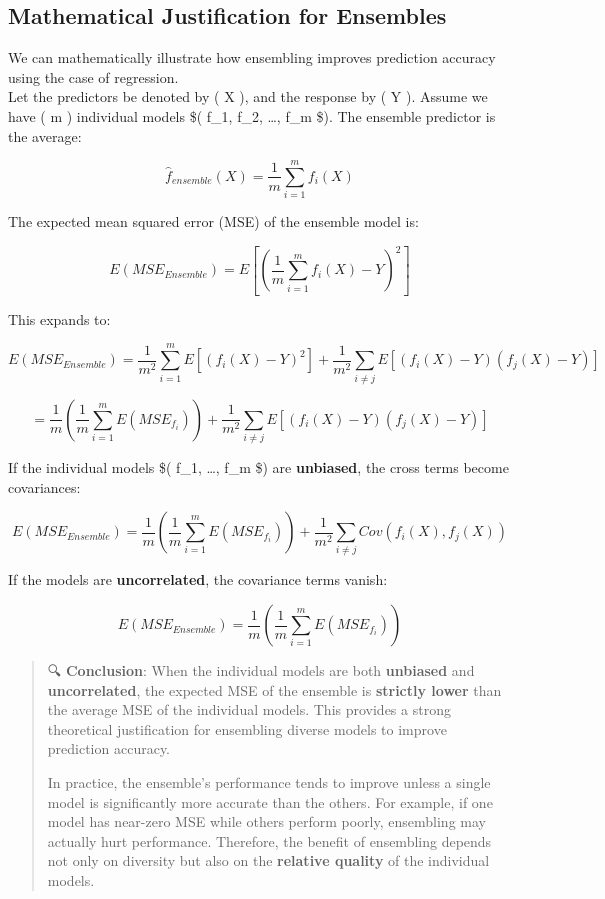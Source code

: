 \documentclass[
  letterpaper,
  DIV=11,
  numbers=noendperiod]{scrreprt}
\begin{document}
\subsection{Mathematical Justification for
Ensembles}\label{mathematical-justification-for-ensembles}

We can mathematically illustrate how ensembling improves prediction
accuracy using the case of regression.\\
Let the predictors be denoted by ( X ), and the response by ( Y ).
Assume we have ( m ) individual models \$( f\_1, f\_2, \dots, f\_m \$).
The ensemble predictor is the average:

\[
\hat{f}_{ensemble}(X) = \frac{1}{m} \sum_{i=1}^{m} f_i(X)
\]

The expected mean squared error (MSE) of the ensemble model is:

\[
E(MSE_{Ensemble}) = E\left[\left( \frac{1}{m} \sum_{i = 1}^{m} f_i(X) - Y \right)^2 \right]
\]

This expands to:

\[
E(MSE_{Ensemble}) = \frac{1}{m^2} \sum_{i = 1}^{m} E\left[(f_i(X) - Y)^2 \right] + \frac{1}{m^2} \sum_{i \ne j} E\left[(f_i(X) - Y)(f_j(X) - Y) \right]
\]

\[
= \frac{1}{m} \left( \frac{1}{m} \sum_{i=1}^m E(MSE_{f_i}) \right) + \frac{1}{m^2} \sum_{i \ne j} E\left[(f_i(X) - Y)(f_j(X) - Y) \right]
\]

If the individual models \$( f\_1, \dots, f\_m \$) are
\textbf{unbiased}, the cross terms become covariances:

\[
E(MSE_{Ensemble}) = \frac{1}{m} \left( \frac{1}{m} \sum_{i=1}^m E(MSE_{f_i}) \right) + \frac{1}{m^2} \sum_{i \ne j} Cov(f_i(X), f_j(X))
\]

If the models are \textbf{uncorrelated}, the covariance terms vanish:

\[
E(MSE_{Ensemble}) = \frac{1}{m} \left( \frac{1}{m} \sum_{i=1}^m E(MSE_{f_i}) \right)
\]

\begin{quote}
🔍 \textbf{Conclusion}: When the individual models are both
\textbf{unbiased} and \textbf{uncorrelated}, the expected MSE of the
ensemble is \textbf{strictly lower} than the average MSE of the
individual models. This provides a strong theoretical justification for
ensembling diverse models to improve prediction accuracy.

In practice, the ensemble's performance tends to improve unless a single
model is significantly more accurate than the others. For example, if
one model has near-zero MSE while others perform poorly, ensembling may
actually hurt performance. Therefore, the benefit of ensembling depends
not only on diversity but also on the \textbf{relative quality} of the
individual models.
\end{quote}
\end{document}
